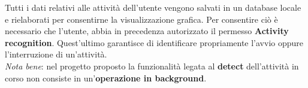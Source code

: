 \documentclass{article}
\begin{document}
Tutti i dati relativi alle attività dell'utente vengono salvati in un database locale e rielaborati per consentirne la visualizzazione grafica. Per consentire ciò è necessario che l'utente, abbia in precedenza autorizzato il permesso \textbf{Activity recognition}. Quest'ultimo garantisce di identificare propriamente l'avvio oppure l'interruzione di un'attività. \vspace*{7pt}\\
\textit{Nota bene}: nel progetto proposto la funzionalità legata al \textbf{detect} dell'attività in corso non consiste in un'\textbf{operazione in background}.
\begin{center}
    \begin{figure}[h]
        \centering
    \end{figure}
\end{center}
\end{document}

